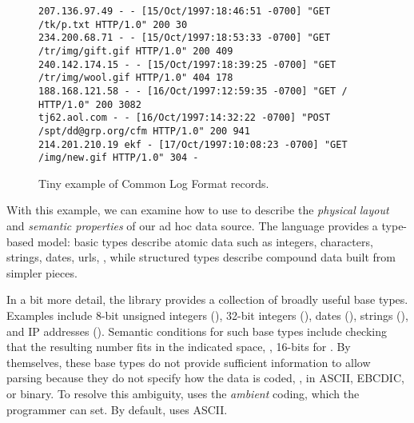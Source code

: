 \documentclass[11pt]{article}
\begin{document}
\begin{figure*}
\begin{footnotesize}
\begin{verbatim}
207.136.97.49 - - [15/Oct/1997:18:46:51 -0700] "GET /tk/p.txt HTTP/1.0" 200 30
234.200.68.71 - - [15/Oct/1997:18:53:33 -0700] "GET /tr/img/gift.gif HTTP/1.0" 200 409
240.142.174.15 - - [15/Oct/1997:18:39:25 -0700] "GET /tr/img/wool.gif HTTP/1.0" 404 178
188.168.121.58 - - [16/Oct/1997:12:59:35 -0700] "GET / HTTP/1.0" 200 3082
tj62.aol.com - - [16/Oct/1997:14:32:22 -0700] "POST /spt/dd@grp.org/cfm HTTP/1.0" 200 941
214.201.210.19 ekf - [17/Oct/1997:10:08:23 -0700] "GET /img/new.gif HTTP/1.0" 304 -
\end{verbatim}
\caption{Tiny example of Common Log Format records. }
\label{figure:clf-records}
\end{footnotesize}
\end{figure*}

With this example, we can examine how to use \pads{} to describe 
the {\em physical layout} and 
{\em semantic properties} of our ad hoc data source. 
The language provides a type-based model:
basic types describe atomic data such as integers, characters, 
strings, dates, urls, \etc, while
structured types describe compound data built from simpler pieces.

In a bit more detail,
the \pads{} library provides a collection of broadly useful base
types.  Examples include 8-bit unsigned integers (), 32-bit
integers (), dates (), strings (),
and IP addresses ().  Semantic conditions for such base types
include checking that the resulting number fits in the indicated
space, \ie, 16-bits for .  By themselves, these base types
do not provide sufficient information to allow parsing because they do
not specify how the data is coded, \ie{}, in ASCII, EBCDIC, or binary.
To resolve this ambiguity, \pads{} uses the \textit{ambient} coding,
which the programmer can set.  By default, \pads{} uses ASCII.  
\end{document}
